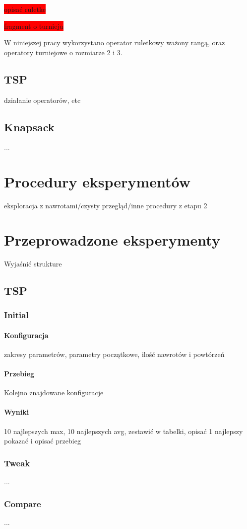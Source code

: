 \documentclass[twoside]{iisthesis}
\newcommand{\todo}{\colorbox{red}}
\begin{document}
\todo{opisać ruletke}

\todo{fragment o turnieju}

W niniejszej pracy wykorzystano operator ruletkowy ważony rangą, oraz operatory turniejowe o rozmiarze 2 i 3.

\subsection{TSP}
działanie operatorów, etc
\subsection{Knapsack}
...
\section{Procedury eksperymentów}
eksploracja z nawrotami/czysty przegląd/inne procedury z etapu 2
\section{Przeprowadzone eksperymenty}
Wyjaśnić strukture
\subsection{TSP}
\subsubsection{Initial}
\paragraph{Konfiguracja}
zakresy parametrów, parametry początkowe, ilość nawrotów i powtórzeń
\paragraph{Przebieg}
Kolejno znajdowane konfiguracje
\paragraph{Wyniki}
10 najlepszych max, 10 najlepszych avg, zestawić w tabelki, opisać
1 najlepszy pokazać i opisać przebieg
\subsubsection{Tweak}
...
\subsubsection{Compare}
...
\end{document}
